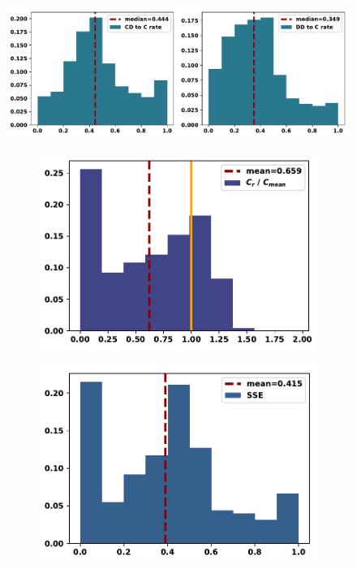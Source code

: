 \documentclass{article}
\begin{document}
\begin{figure}[!htbp]
    \centering
    \includegraphics[width=.65\textwidth]{../images/rates_of_winners_in_probend_noisy_tournaments.pdf}
\end{figure}

\begin{figure}[!htbp]
    \centering
    \begin{subfigure}{0.35\textwidth}
        \centering
        \includegraphics[width=\textwidth]{../images/compared_to_mean_overall.pdf}
    \end{subfigure}
    \begin{subfigure}{0.35\textwidth}
        \centering
        \includegraphics[width=\textwidth]{../images/rate_overall.pdf}

\end{subfigure}
\end{figure}
\end{document}
